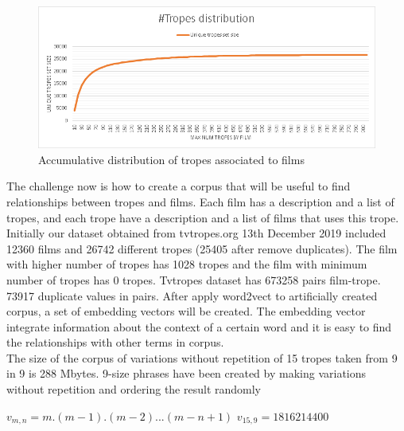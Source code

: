 \documentclass[letterpaper]{article}
\begin{document}
	\begin{figure}
		\centering
		\includegraphics[width=1\linewidth]{../images/tropes_distribution_chart.png}
		\caption{Accumulative distribution of tropes associated to films}
		\label{fig:tropesdistributionasociatedtofilms}
	\end{figure}
	
	The challenge now is how to create a corpus that will be useful to find relationships between tropes and films. Each film has a description and a list of tropes, and each trope have a description and a list of films that uses this trope. Initially our dataset obtained from tvtropes.org 13th December 2019 included 12360 films and 26742 different tropes (25405 after remove duplicates). The film with higher number of tropes has 1028 tropes and the film with minimum number of tropes has 0 tropes. Tvtropes dataset has 673258 pairs film-trope. 73917 duplicate values in pairs. After apply word2vect to artificially created corpus, a set of embedding vectors will be created. The embedding vector integrate information about the context of a certain word and it is easy to find the relationships with other terms in corpus.\\
	
	The size of the corpus of variations without repetition of 15 tropes taken from 9 in 9 is 288 Mbytes. 9-size phrases have been created by making variations without repetition and ordering the result randomly \\
	
	\begin{center}
		
		${v}_{m,n} = m.(m-1).(m-2)...(m-n+1)$
		${v}_{15,9} = 1816214400$
		
	\end{center}
	
	
\end{document}
